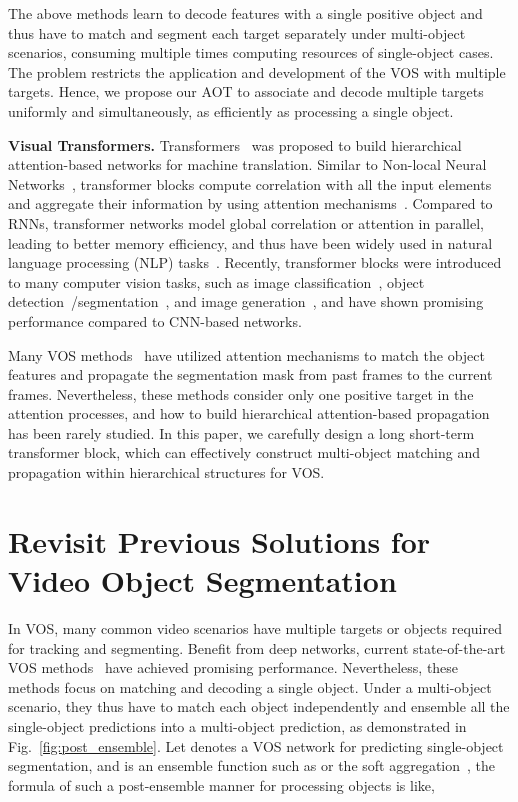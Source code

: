 \documentclass{article}
\begin{document}
The above methods learn to decode features with a single positive object and thus have to match and segment each target separately under multi-object scenarios, consuming multiple times computing resources of single-object cases. The problem restricts the application and development of the VOS with multiple targets. Hence, we propose our AOT to associate and decode multiple targets uniformly and simultaneously, as efficiently as processing a single object.

\noindent\textbf{Visual Transformers.} Transformers~\cite{transformer} was proposed to build hierarchical attention-based networks for machine translation. Similar to Non-local Neural Networks~\cite{nonlocal}, transformer blocks compute correlation with all the input elements and aggregate their information by using attention mechanisms~\cite{att}. Compared to RNNs, transformer networks model global correlation or attention in parallel, leading to better memory efficiency, and thus have been widely used in natural language processing (NLP) tasks~\cite{devlin2018bert,radford2019language,synnaeve2019end}. Recently, transformer blocks were introduced
to many computer vision tasks, such as image classification~\cite{vit,vaswani2021scaling,swin}, object detection~\cite{detr}/segmentation~\cite{vistr}, and image generation~\cite{parmar2018image}, and have shown promising performance compared to CNN-based networks.

Many VOS methods~\cite{lin2019agss,spacetime,EGMN,KMN} have utilized attention mechanisms to match the object features and propagate the segmentation mask from past frames to the current frames. Nevertheless, these methods consider only one positive target in the attention processes, and how to build hierarchical attention-based propagation has been rarely studied. In this paper, we carefully design a long short-term transformer block, which can effectively construct multi-object matching and propagation within hierarchical structures for VOS.


 
\section{Revisit Previous Solutions for Video Object Segmentation} 
In VOS, many common video scenarios have multiple targets or objects required for tracking and segmenting. Benefit from deep networks, current state-of-the-art VOS methods~\cite{spacetime,cfbi} have achieved promising performance. Nevertheless, these methods focus on matching and decoding a single object. Under a multi-object scenario, they thus have to match each object independently and ensemble all the single-object predictions into a multi-object prediction, as demonstrated in Fig.~\ref{fig:post_ensemble}. Let  denotes a VOS network for predicting single-object segmentation, and  is an ensemble function such as  or the soft aggregation~\cite{spacetime}, the formula of such a post-ensemble manner for processing  objects is like,
\end{document}
